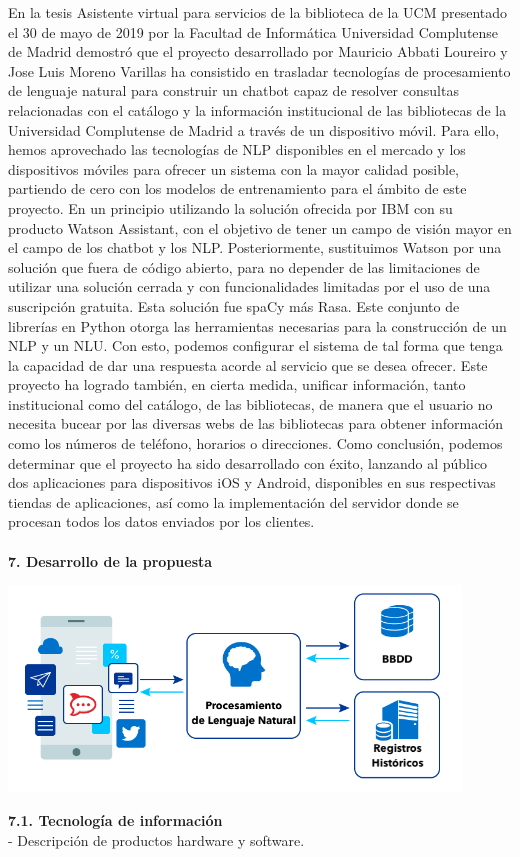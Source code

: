 \begin{flushleft}
\begin{itemize}
En la tesis Asistente virtual para servicios de la biblioteca de la UCM presentado el 30 de mayo de 2019 por la Facultad de Informática Universidad Complutense de Madrid demostró que el proyecto desarrollado por Mauricio Abbati Loureiro y Jose Luis Moreno Varillas ha consistido en trasladar tecnologías de procesamiento de lenguaje natural para construir un chatbot capaz de resolver consultas relacionadas con el catálogo y la información institucional de las bibliotecas de la Universidad Complutense de Madrid a través de un dispositivo móvil. Para ello, hemos aprovechado las tecnologías de NLP disponibles en el mercado y los dispositivos móviles para ofrecer un sistema con la mayor calidad posible, partiendo de cero con los modelos de entrenamiento para el ámbito de este proyecto. En un principio utilizando la solución ofrecida por IBM con su producto Watson Assistant, con el objetivo de tener un campo de visión mayor en el campo de los chatbot y los NLP. Posteriormente, sustituimos Watson por una solución que fuera de código abierto, para no depender de las limitaciones de utilizar una solución cerrada y con funcionalidades limitadas por el uso de una suscripción gratuita. Esta solución fue spaCy más Rasa. Este conjunto de librerías en Python otorga las herramientas necesarias para la construcción de un NLP y un NLU. Con esto, podemos configurar el sistema de tal forma que tenga la capacidad de dar una respuesta acorde al servicio que se desea ofrecer. Este proyecto ha logrado también, en cierta medida, unificar información, tanto institucional como del catálogo, de las bibliotecas, de manera que el usuario no necesita bucear por las diversas webs de las bibliotecas para obtener información como los números de teléfono, horarios o direcciones. Como conclusión, podemos determinar que el proyecto ha sido desarrollado con éxito, lanzando al público dos aplicaciones para dispositivos iOS y Android, disponibles en sus respectivas tiendas de aplicaciones, así como la implementación del servidor donde se procesan todos los datos enviados por los clientes.\\
\textbf{ }\\

\textbf{7.      Desarrollo de la propuesta}\\

\begin{center}
	\includegraphics[width=12cm]{./Imagenes/nlp} 
	\end{center}
\textbf{7.1.   Tecnología de información}\\
-	Descripción de productos hardware y software.\\ 
\textbf{ }\\


\end{itemize}
\end{flushleft}
